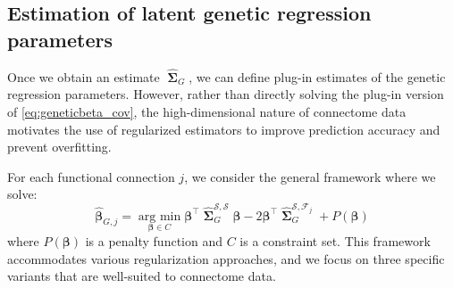 \documentclass[12pt]{article}
\newcommand{\argmin}{\operatorname*{arg \ min}}
\DeclareMathOperator{\bSigma}{\mathbf{\Sigma}}
\DeclareMathOperator{\tr}{tr}
\begin{document}


\subsection{Estimation of latent genetic regression parameters} \label{sec:regression_estimation}

Once we obtain an estimate $\hat{\bSigma}_G$, we can define plug-in estimates of the genetic regression parameters. However, rather than directly solving the plug-in version of \eqref{eq:geneticbeta_cov}, the high-dimensional nature of connectome data motivates the use of regularized estimators to improve prediction accuracy and prevent overfitting.

For each functional connection $j$, we consider the general framework where we solve:
\begin{equation} \label{eq:reg_regression}
\hat{\boldsymbol{\beta}}_{G,j} = \argmin_{\boldsymbol{\beta} \in C} \boldsymbol{\beta}^\top \hat{\bSigma}_G^{\mathcal{S},\mathcal{S}} \boldsymbol{\beta} - 2\boldsymbol{\beta}^\top \hat{\bSigma}_G^{\mathcal{S},\mathcal{F}_j} + P(\boldsymbol{\beta})
\end{equation}
where $P(\boldsymbol{\beta})$ is a penalty function and $C$ is a constraint set. This framework accommodates various regularization approaches, and we focus on three specific variants that are well-suited to connectome data.
\end{document}
